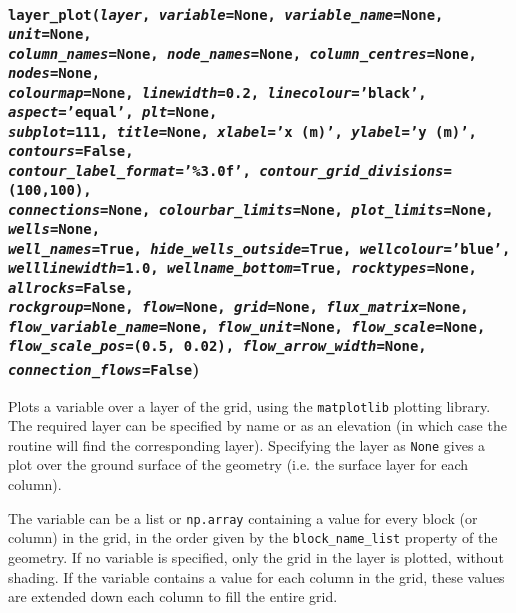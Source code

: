 \begin{snugshade}
\subsubsection{\texttt{layer\_plot(\emph{layer}, \emph{variable}=None, \emph{variable\_name}=None, \emph{unit}=None,\\
    \emph{column\_names}=None, \emph{node\_names}=None, \emph{column\_centres}=None, \emph{nodes}=None,\\
    \emph{colourmap}=None, \emph{linewidth}=0.2, \emph{linecolour}='black', \emph{aspect}='equal', \emph{plt}=None,\\
    \emph{subplot}=111, \emph{title}=None, \emph{xlabel}='x (m)', \emph{ylabel}='y (m)', \emph{contours}=False,\\
    \emph{contour\_label\_format}='\%3.0f', \emph{contour\_grid\_divisions}=(100,100),\\
    \emph{connections}=None, \emph{colourbar\_limits}=None, \emph{plot\_limits}=None, \emph{wells}=None,\\
    \emph{well\_names}=True, \emph{hide\_wells\_outside}=True, \emph{wellcolour}='blue', \\
    \emph{welllinewidth}=1.0, \emph{wellname\_bottom}=True, \emph{rocktypes}=None, \emph{allrocks}=False,\\
    \emph{rockgroup}=None, \emph{flow}=None, \emph{grid}=None, \emph{flux\_matrix}=None,\\
    \emph{flow\_variable\_name}=None, \emph{flow\_unit}=None, \emph{flow\_scale}=None,\\
    \emph{flow\_scale\_pos}=(0.5, 0.02), \emph{flow\_arrow\_width}=None, \emph{connection\_flows}=False})}\end{snugshade}
\label{sec:mulgrid:layer_plot}

Plots a variable over a layer of the grid, using the \texttt{matplotlib} plotting library.  The required layer can be specified by name or as an elevation (in which case the routine will find the corresponding layer).  Specifying the layer as \texttt{None} gives a plot over the ground surface of the geometry (i.e. the surface layer for each column).

The variable can be a list or \texttt{np.array} containing a value for every block (or column) in the grid, in the order given by the \texttt{block\_name\_list} property of the geometry. If no variable is specified, only the grid in the layer is plotted, without shading.  If the variable contains a value for each column in the grid, these values are extended down each column to fill the entire grid.

